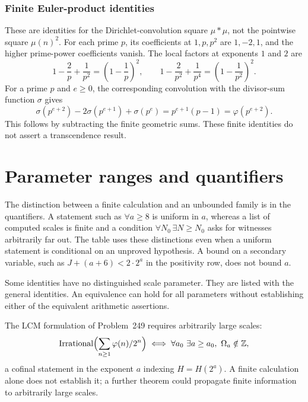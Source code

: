 \subsubsection{Finite Euler-product identities}

These are identities for the Dirichlet-convolution square $\mu*\mu$,
not the pointwise square $\mu(n)^2$. For each prime $p$, its coefficients
at $1,p,p^2$ are $1,-2,1$, and the higher prime-power coefficients vanish.
The local factors at exponents $1$ and $2$ are
\[
 1-\frac2p+\frac1{p^2}=\left(1-\frac1p\right)^2,
 \qquad
 1-\frac2{p^2}+\frac1{p^4}=\left(1-\frac1{p^2}\right)^2.
\]
For a prime $p$ and $e\ge0$, the corresponding convolution with the
divisor-sum function $\sigma$ gives
\[
 \sigma(p^{e+2})-2\sigma(p^{e+1})+\sigma(p^e)
       =p^{e+1}(p-1)=\varphi(p^{e+2}).
\]
This follows by subtracting the finite geometric sums. These finite
identities do not assert a transcendence result.
\quad {}
\section{Parameter ranges and quantifiers}\label{sec:249-scale-ladder}

The distinction between a finite calculation and an unbounded family
is in the quantifiers. A statement such as $\forall a\ge8$ is uniform
in $a$, whereas a list of computed scales is finite and a condition
$\forall N_0\,\exists N\ge N_0$ asks for witnesses arbitrarily far out.
The table uses these distinctions even when a uniform statement is
conditional on an unproved hypothesis. A bound on a secondary variable,
such as $J+(a+6)<2\cdot2^a$ in the positivity row, does not bound $a$.


Some identities have no distinguished scale parameter. They are listed
with the general identities. An equivalence can hold for all parameters
without establishing either of the equivalent arithmetic assertions.


The LCM formulation of Problem~249 requires arbitrarily large scales:
\[
  \mathrm{Irrational}\Bigl(\sum_{n\ge 1}\varphi(n)/2^n\Bigr) \iff \forall a_0\ \exists a\ge a_0,\ \Omega_a \notin \mathbb Z,
\]
a cofinal statement in the exponent $a$ indexing $H=H(2^a)$.
A finite calculation alone does not establish it; a further theorem
could propagate finite information to arbitrarily large scales.

